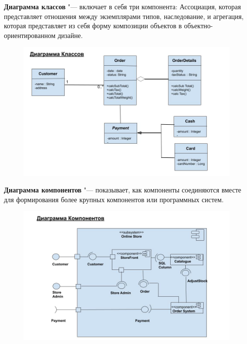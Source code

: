 \documentclass[bachelor, och, pract]{SCWorks}
\theoremstyle{remark}
\begin{document}
    \newpage
    \textbf{Диаграмма классов} "--- включает в себя три компонента: Ассоциация, которая представляет отношения между экземплярами типов, наследование, и агрегация, которая представляет из себя форму композиции объектов в объектно-ориентированном дизайне.

    \begin{figure}[H]
        \begin{center}
            \includegraphics[scale=0.5]{res/class-diagram.png}
        \end{center}
    \end{figure}

    \newpage
    \textbf{Диаграмма компонентов} "--- показывает, как компоненты соединяются вместе для формирования более крупных компонентов или программных систем.

    \begin{figure}[H]
        \begin{center}
            \includegraphics[scale=0.5]{res/component-diagram.png}
        \end{center}
    \end{figure}
\end{document}
